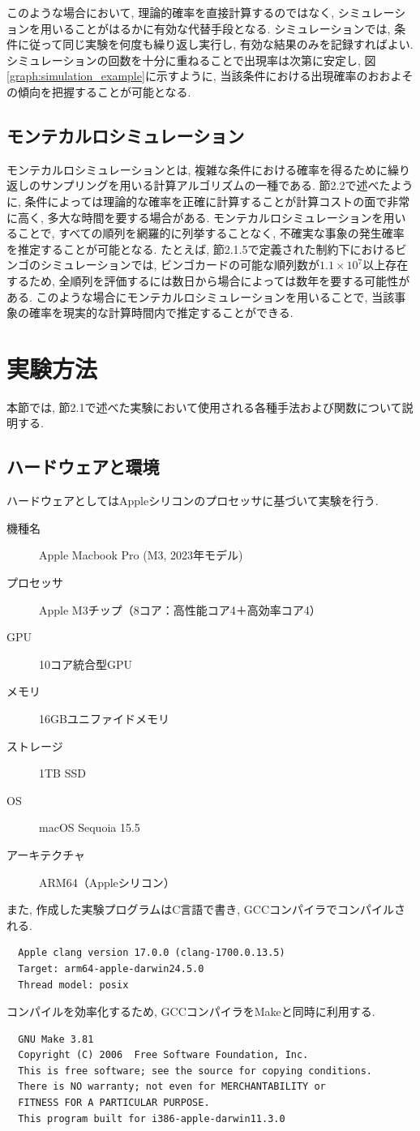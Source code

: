 \documentclass[a4j, 12pt ]{jarticle}
\begin{document}
このような場合において, 理論的確率を直接計算するのではなく, シミュレーションを用いることがはるかに有効な代替手段となる. シミュレーションでは, 条件に従って同じ実験を何度も繰り返し実行し, 有効な結果のみを記録すればよい. シミュレーションの回数を十分に重ねることで出現率は次第に安定し, 図\ref{graph:simulation_example}に示すように, 当該条件における出現確率のおおよその傾向を把握することが可能となる.


\subsection{モンテカルロシミュレーション}
モンテカルロシミュレーションとは, 複雑な条件における確率を得るために繰り返しのサンプリングを用いる計算アルゴリズムの一種である. 節2.2で述べたように, 条件によっては理論的な確率を正確に計算することが計算コストの面で非常に高く, 多大な時間を要する場合がある. モンテカルロシミュレーションを用いることで, すべての順列を網羅的に列挙することなく, 不確実な事象の発生確率を推定することが可能となる. たとえば, 節2.1.5で定義された制約下におけるビンゴのシミュレーションでは, ビンゴカードの可能な順列数が$1.1 \times 10^7$以上存在するため, 全順列を評価するには数日から場合によっては数年を要する可能性がある. このような場合にモンテカルロシミュレーションを用いることで, 当該事象の確率を現実的な計算時間内で推定することができる.\cite{ibmMonteCarlo}

\section{実験方法}
本節では, 節2.1で述べた実験において使用される各種手法および関数について説明する.
\subsection{ハードウェアと環境}
ハードウェアとしてはAppleシリコンのプロセッサに基づいて実験を行う. 
\begin{description}
  \item[機種名] Apple Macbook Pro (M3, 2023年モデル)
  \item[プロセッサ] Apple M3チップ（8コア：高性能コア4＋高効率コア4）
  \item[GPU] 10コア統合型GPU
  \item[メモリ] 16GBユニファイドメモリ
  \item[ストレージ] 1TB SSD
  \item[OS] macOS Sequoia 15.5
  \item[アーキテクチャ] ARM64（Appleシリコン） 
\end{description}
また, 作成した実験プログラムはC言語で書き, GCCコンパイラでコンパイルされる. 
\begin{verbatim}
  Apple clang version 17.0.0 (clang-1700.0.13.5)
  Target: arm64-apple-darwin24.5.0
  Thread model: posix
\end{verbatim}
コンパイルを効率化するため, GCCコンパイラをMakeと同時に利用する. 
\begin{verbatim}
  GNU Make 3.81
  Copyright (C) 2006  Free Software Foundation, Inc.
  This is free software; see the source for copying conditions.
  There is NO warranty; not even for MERCHANTABILITY or 
  FITNESS FOR A PARTICULAR PURPOSE.
  This program built for i386-apple-darwin11.3.0
\end{verbatim}
\end{document}
